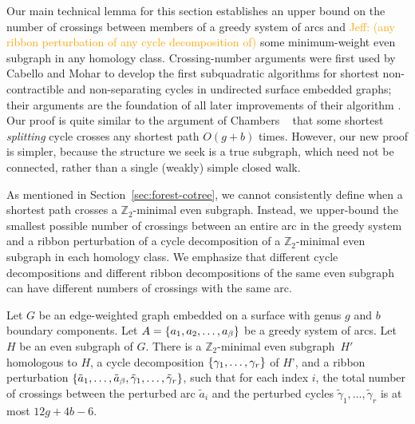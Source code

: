 \documentclass[letterpaper,review]{siamart190516}
\def\Z{\mathbb{Z}}
\def\jnote#1{\textcolor{orange}{Jeff: #1}}
\begin{document}
Our main technical lemma for this section establishes an upper bound on the number of crossings between members of a greedy system of arcs and \jnote{(any ribbon perturbation of any cycle decomposition of)} some minimum-weight even subgraph in any homology class.  Crossing-number arguments were first used by Cabello and Mohar \cite{cm-fsnsn-07} to develop the first subquadratic algorithms for shortest non-contractible and non-separating cycles in undirected surface embedded graphs; their arguments are the foundation of all later improvements of their algorithm \cite{c-mdpg-06, k-csnco-06, cce-msspe-13}.  Our proof is quite similar to the argument of Chambers \etal~\cite{ccelw-scsih-08} that some shortest \emph{splitting} cycle crosses any shortest path $O(g+b)$ times.  However, our new proof is simpler, because the structure we seek is a true subgraph, which need not be connected, rather than a single (weakly) simple closed walk.

As mentioned in Section~\ref{sec:forest-cotree}, we cannot consistently define when a shortest path crosses a $\Z_2$-minimal even subgraph.  Instead, we upper-bound the smallest possible number of crossings between an entire arc in the greedy system and a ribbon perturbation of a cycle decomposition of a $\Z_2$-minimal even subgraph in each homology class.  We emphasize that different cycle decompositions and different ribbon decompositions of the same even subgraph can have different numbers of crossings with the same arc.

\begin{lemma}
\label{lem:crossing}
Let $G$ be an edge-weighted graph embedded on a surface with genus $g$ and $b$ boundary components.
Let $A = \left\{ a_1, a_2, \dots, a_\beta \right\}$ be a greedy system of arcs.
Let $H$ be an even subgraph of $G$.
There is a $\Z_2$-minimal even subgraph~$H'$ homologous to $H$, a cycle decomposition $\{ \gamma_1, \dots, \gamma_r \}$ of $H’$, and a ribbon perturbation $\{ \tilde{a}_1,  \dots, \tilde{a}_\beta, \tilde\gamma_1, \dots, \tilde\gamma_r \}$, such that for each index $i$, the total number of crossings between the perturbed arc $\tilde{a}_i$ and the perturbed cycles $\tilde\gamma_1,  \dots, \tilde\gamma_r$ is at most $12g+4b-6$.
\end{lemma}

\end{document}
